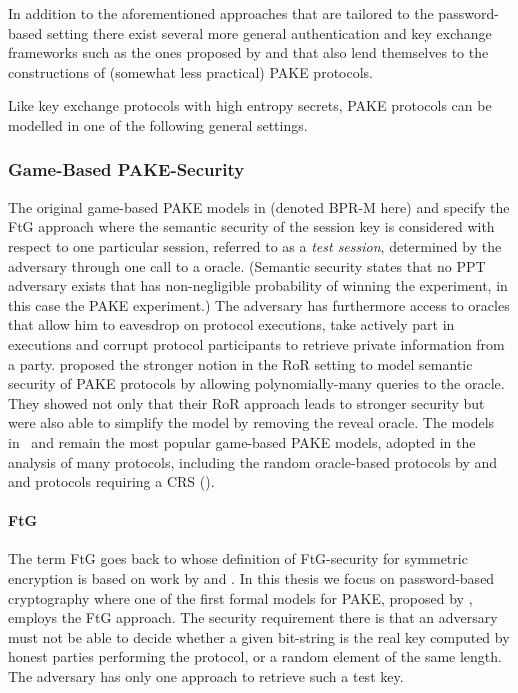 In addition to the aforementioned approaches that are tailored to the password-based setting there exist several more general authentication and key exchange frameworks such as the ones proposed by \citet{Camenisch2010} and \citet{Blazy2012} that also lend themselves to the constructions of (somewhat less practical) \ac{PAKE} protocols.

Like key exchange protocols with high entropy secrets, \ac{PAKE} protocols can be modelled in one of the following general settings.

\subsubsection{Game-Based PAKE-Security}
The original game-based \ac{PAKE} models in \citet{Bellare2000} (denoted \ac{BPR-M} here) and \citet{Boyko2000} specify the \ac{FtG} approach where the semantic security of the session key is considered with respect to one particular session, referred to as a \emph{test session}, determined by the adversary through one call to a \Test oracle.
(Semantic security states that no \ac{PPT} adversary exists that has non-negligible probability of winning the experiment, in this case the \ac{PAKE} experiment.)
The adversary has furthermore access to oracles that allow him to eavesdrop on protocol executions, take actively part in executions and corrupt protocol participants to retrieve private information from a party.
\citet{Abdalla2005} proposed the stronger notion in the \ac{RoR} setting to model semantic security of PAKE protocols by allowing polynomially-many queries to the \Test oracle.
They showed not only that their \ac{RoR} approach leads to stronger security but were also able to simplify the model by removing the reveal oracle.
The models in~\citet{Bellare2000} and \citet{Abdalla2005} remain the most popular game-based PAKE models, adopted in the analysis of many protocols, including the random oracle-based protocols by \citet{Abdalla2006} and \citet{Abdalla2005b} and protocols requiring a \ac{CRS} (\citet{KatzOY01,Gennaro2003,Gennaro2008,Katz2009a}).


\paragraph{\acl{FtG}}
The term \acl{FtG} goes back to \citet{Bellare97} whose definition of \ac{FtG}-security for symmetric encryption is based on work by \citet{Goldwasser84} and \citet{Micali86}.
In this thesis we focus on password-based cryptography where one of the first formal models for \ac{PAKE}, proposed by \citet{Bellare2000}, employs the \ac{FtG} approach.
The security requirement there is that an adversary must not be able to decide whether a given bit-string is the real key computed by honest parties performing the protocol, or a random element of the same length.
The adversary has only one approach to retrieve such a test key.


